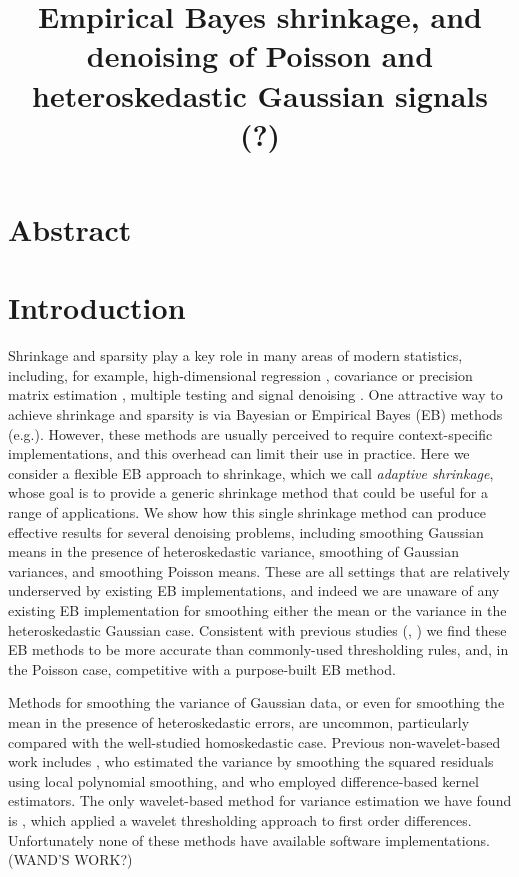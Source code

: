 \documentclass[12pt]{article}
\begin{document}
\title{\textbf{Empirical Bayes shrinkage, and denoising of Poisson and heteroskedastic Gaussian signals (?)}}
\date{}
\maketitle

\section{Abstract}

\section{Introduction}

Shrinkage and sparsity play a key role in many areas of modern statistics, including, for example, high-dimensional regression \cite{Tibshirani1996Regression}, covariance or precision matrix estimation \cite{Bickel2008Covariance}, multiple testing \cite{efron:xx} and signal denoising \cite{Donoho1994Ideal, donoho95}. One attractive way to achieve shrinkage and sparsity is via Bayesian or Empirical Bayes (EB) methods (e.g.\cite{efron?, Johnstone2005Empirical, Clyde2000Flexible,george.mccullogh,bayesian-covariance-estimation}).  
However, these methods are usually perceived to require context-specific implementations, and this overhead can limit their use in practice. Here we consider a flexible EB approach to shrinkage, which we call {\it adaptive shrinkage}, whose goal is to provide a generic shrinkage method that could be useful for a range of applications. 
We show how this single shrinkage method can produce effective results for several denoising problems, including smoothing Gaussian means in the presence of heteroskedastic variance, smoothing of Gaussian variances, and smoothing Poisson means. These are all settings that are relatively underserved by existing EB implementations, and indeed  we are unaware of any existing EB implementation for smoothing either the mean or the variance in the heteroskedastic Gaussian case.
Consistent with previous studies (\cite{Antoniadis2001Wavelet}, \cite{Besbeas2004Comparative}) we find these EB methods to be more accurate than commonly-used thresholding rules, and, in the Poisson case, competitive with a purpose-built EB method.

Methods for smoothing the variance of Gaussian data, or even for smoothing the mean in the presence of heteroskedastic errors, are uncommon, particularly compared with the well-studied homoskedastic case. Previous non-wavelet-based work includes \cite{Fan1998Efficient}, who estimated the variance by smoothing the squared residuals using local polynomial smoothing, and \cite{Brown2007Variance} who employed difference-based kernel estimators. The only wavelet-based method for variance estimation we have found is \cite{Cai2008Adaptive}, which applied a wavelet thresholding approach to first order differences. Unfortunately none of these methods have available software implementations. (WAND'S WORK?)
\end{document}

